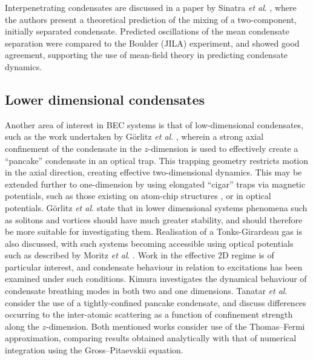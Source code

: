 Interpenetrating condensates are discussed in a paper by Sinatra \textit{et al}. \cite{BEC:Sinatra_prl_1999}, where the authors present a theoretical prediction of the mixing of a two-component, initially separated condensate. Predicted oscillations of the mean condensate separation were compared to the Boulder (JILA) experiment, and showed good agreement, supporting the use of mean-field theory in predicting condensate dynamics.

\subsection{Lower dimensional condensates}\label{sub:coldatom_recent}
Another area of interest in BEC systems is that of low-dimensional condensates, such as the work undertaken by G\"{o}rlitz \textit{et al}. \cite{BEC:Gorlitz_prl_2001}, wherein a strong axial confinement of the
condensate in the $z$-dimension is used to effectively create a ``pancake'' condensate in an optical trap. This trapping geometry restricts motion in the axial direction, creating effective two-dimensional dynamics. This may be extended further to one-dimension by using elongated ``cigar'' traps via magnetic potentials, such as those existing on atom-chip structures \cite{AO:Denschlag_prl_1999,AO:Folman_prl_2000,AO:Haase_pra_2001}, or in optical potentials. G\"{o}rlitz \textit{et al.} state that in lower dimensional systems phenomena such as solitons and vortices should have much greater stability, and should therefore be more suitable for investigating them. Realisation of a Tonks-Girardeau gas is also discussed, with such systems becoming accessible using optical potentials such as described by Moritz \textit{et al}. \cite{OL:Moritz_prl_2003}. Work in the effective 2D regime is of particular interest, and condensate behaviour in relation to excitations has been examined under such conditions. Kimura \cite{BEC:Kimura_pra_2002} investigates the dynamical behaviour of condensate breathing modes in both two and one dimensions. Tanatar \textit{et al}. \cite{BEC:Tanatar_arxiv_2002} consider the use of a tightly-confined pancake condensate, and discuss differences occurring to the inter-atomic scattering as a function of confinement strength along the $z$-dimension. Both mentioned works consider use of the Thomas--Fermi approximation, comparing results obtained analytically with that of numerical integration using the Gross--Pitaevskii equation.


